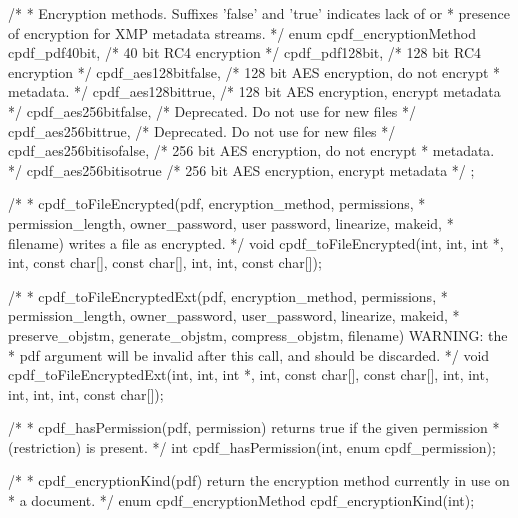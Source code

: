 /*
 * Encryption methods. Suffixes 'false' and 'true' indicates lack of or
 * presence of encryption for XMP metadata streams.
 */
enum cpdf_encryptionMethod {
  cpdf_pdf40bit,          /* 40 bit RC4 encryption */
  cpdf_pdf128bit,         /* 128 bit RC4 encryption */
  cpdf_aes128bitfalse,    /* 128 bit AES encryption, do not encrypt
                           * metadata. */
  cpdf_aes128bittrue,     /* 128 bit AES encryption, encrypt metadata */
  cpdf_aes256bitfalse,    /* Deprecated. Do not use for new files */
  cpdf_aes256bittrue,     /* Deprecated. Do not use for new files */
  cpdf_aes256bitisofalse, /* 256 bit AES encryption, do not encrypt
                           * metadata. */
  cpdf_aes256bitisotrue   /* 256 bit AES encryption, encrypt metadata */
};

/*
 * cpdf_toFileEncrypted(pdf, encryption_method, permissions,
 * permission_length, owner_password, user password, linearize, makeid,
 * filename) writes a file as encrypted.
 */
void cpdf_toFileEncrypted(int, int, int *, int, const char[], const char[], int,
                          int, const char[]);

/*
 * cpdf_toFileEncryptedExt(pdf, encryption_method, permissions,
 * permission_length, owner_password, user_password, linearize, makeid,
 * preserve_objstm, generate_objstm, compress_objstm, filename) WARNING: the
 * pdf argument will be invalid after this call, and should be discarded.
 */
void cpdf_toFileEncryptedExt(int, int, int *, int, const char[], const char[],
                             int, int, int, int, int, const char[]);

/*
 * cpdf_hasPermission(pdf, permission) returns true if the given permission
 * (restriction) is present.
 */
int cpdf_hasPermission(int, enum cpdf_permission);

/*
 * cpdf_encryptionKind(pdf) return the encryption method currently in use on
 * a document.
 */
enum cpdf_encryptionMethod cpdf_encryptionKind(int);


